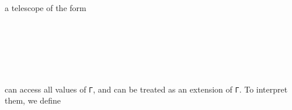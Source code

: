 \begin{code}%
%
\>[2]\AgdaSpace{}%
%
\>[11]\AgdaSpace{}%
\AgdaSpace{}%
\AgdaSymbol{=}\AgdaSpace{}%
\<%
\\
%
\>[2]\AgdaSpace{}%
\AgdaSpace{}%
\AgdaSpace{}%
%
\>[11]\AgdaSpace{}%
\AgdaSpace{}%
\AgdaSymbol{=}\AgdaSpace{}%
\AgdaFunction{Σ[}\AgdaSpace{}%
\AgdaSpace{}%
\AgdaSpace{}%
\AgdaSpace{}%
\AgdaSpace{}%
\AgdaSpace{}%
\AgdaSpace{}%
\AgdaFunction{]}\AgdaSpace{}%
\AgdaSpace{}%
\AgdaSymbol{(}\AgdaSpace{}%
\AgdaOperator{\AgdaInductiveConstructor{,}}\AgdaSpace{}%
\AgdaSymbol{)}\<%
\end{code}
a telescope of the form
\begin{code}%
%
\>[2]\AgdaSpace{}%
\AgdaSymbol{:}\AgdaSpace{}%
\AgdaSpace{}%
\AgdaSpace{}%
\AgdaSpace{}%
\<%
\\
%
\>[2]\AgdaSpace{}%
\AgdaSpace{}%
\AgdaSymbol{=}\AgdaSpace{}%
\AgdaSpace{}%
\AgdaSymbol{(}\AgdaSpace{}%
\AgdaSpace{}%
\AgdaSpace{}%
\AgdaSymbol{)}\<%
\end{code}
\begin{code}[hide]%
%
\>[2]\AgdaSpace{}%
\<%
\\
\>[2][@{}l@{\AgdaIndent{0}}]%
\>[4]\AgdaSpace{}%
\AgdaSpace{}%
\AgdaSymbol{:}\AgdaSpace{}%
\AgdaSpace{}%
\<%
\\
%
\>[4]\AgdaSpace{}%
\AgdaSpace{}%
\AgdaSymbol{:}\AgdaSpace{}%
\AgdaSpace{}%
\<%
\\
%
\>[4]\AgdaSpace{}%
\AgdaSymbol{:}\AgdaSpace{}%
\<%
\end{code}
can access all values of \texttt{Γ}, and can be treated as an extension of \texttt{Γ}. To interpret them, we define

